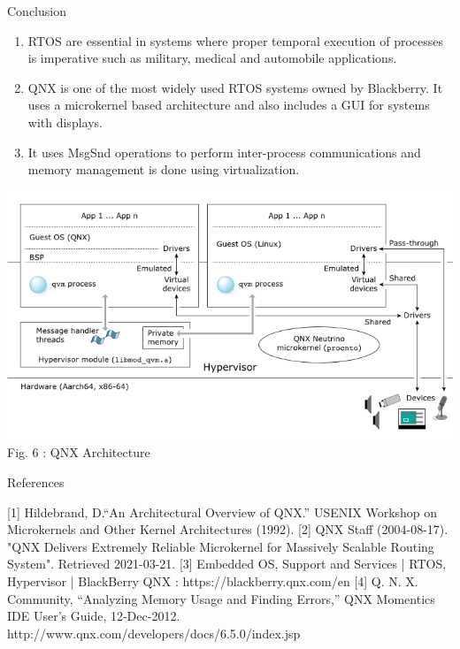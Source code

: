 \documentclass[final]{beamer}
\newlength{\onecolwid}
\begin{document}
\begin{frame}[t]
\begin{columns}[t]
\begin{column}{\onecolwid} %

\begin{block}{Conclusion}
\begin{enumerate}
    \item RTOS are essential in systems where proper temporal execution of processes is imperative such as military, medical and automobile applications.
    \item QNX is one of the most widely used RTOS systems owned by Blackberry. It uses a microkernel based architecture and also includes a GUI for systems with displays.
    \item It uses MsgSnd operations to perform inter-process communications and memory management is done using virtualization.
\end{enumerate}

\begin{center}
 \includegraphics[width=28cm]{qvm_arch.png}\\
 \caption{Fig. 6 : QNX Architecture}
\end{center}

\end{block}


\begin{block}{References}

        [1] Hildebrand, D.“An Architectural Overview of QNX.” USENIX Workshop on Microkernels and Other Kernel Architectures (1992).
    [2] QNX Staff (2004-08-17). "QNX Delivers Extremely Reliable Microkernel for Massively Scalable Routing System". Retrieved 2021-03-21.
    [3] Embedded OS, Support and Services | RTOS, Hypervisor | BlackBerry QNX : https://blackberry.qnx.com/en
    [4] Q. N. X. Community, “Analyzing Memory Usage and Finding Errors,” QNX Momentics IDE User's Guide, 12-Dec-2012. http://www.qnx.com/developers/docs/6.5.0/index.jsp 

\end{block}



\end{column} %

\end{columns} %

\end{frame} %
\end{document}
